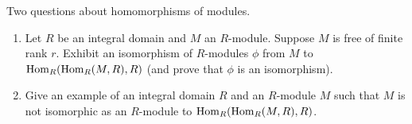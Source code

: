 \begin{question}[subtitle = {August 2023 Problem 4},ID=Aug23_4]
Two questions about homomorphisms of modules.
\begin{enumerate}
    \item Let $R$ be an integral domain and $M$ an $R$-module. Suppose $M$ is free of finite rank $r$. Exhibit an isomorphism of $R$-modules $\phi$ from $M$ to $\operatorname{Hom}_R(\operatorname{Hom}_R(M,R),R)$ (and prove that $\phi$ is an isomorphism).
    \item Give an example of an integral domain $R$ and an $R$-module $M$ such that $M$ is not isomorphic as an $R$-module to $\operatorname{Hom}_R(\operatorname{Hom}_R(M,R),R)$.
\end{enumerate}
\end{question}
